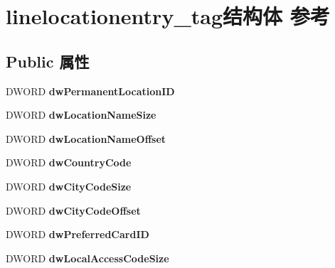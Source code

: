 \hypertarget{structlinelocationentry__tag}{}\section{linelocationentry\+\_\+tag结构体 参考}
\label{structlinelocationentry__tag}
\subsection*{Public 属性}
\begin{DoxyCompactItemize}
\item 
\mbox{\label{structlinelocationentry__tag_a9fea6e60f0cc53c4a5c5ba77cf2d4b78}} 
D\+W\+O\+RD {\bfseries dw\+Permanent\+Location\+ID}
\item 
\mbox{\label{structlinelocationentry__tag_a39fb30be5732d90025f25a7f64115bba}} 
D\+W\+O\+RD {\bfseries dw\+Location\+Name\+Size}
\item 
\mbox{\label{structlinelocationentry__tag_a5acd9a4fa107c3e8fa0ef400892caa88}} 
D\+W\+O\+RD {\bfseries dw\+Location\+Name\+Offset}
\item 
\mbox{\label{structlinelocationentry__tag_ab8a7beae6daeb09466c05abff464bb0c}} 
D\+W\+O\+RD {\bfseries dw\+Country\+Code}
\item 
\mbox{\label{structlinelocationentry__tag_a0d8142492938fa709c0310dc8e93740c}} 
D\+W\+O\+RD {\bfseries dw\+City\+Code\+Size}
\item 
\mbox{\label{structlinelocationentry__tag_aef2063a35836917fccd68130317b556f}} 
D\+W\+O\+RD {\bfseries dw\+City\+Code\+Offset}
\item 
\mbox{\label{structlinelocationentry__tag_a6598277aab590444238d306b9c0215af}} 
D\+W\+O\+RD {\bfseries dw\+Preferred\+Card\+ID}
\item 
\mbox{\label{structlinelocationentry__tag_a47c9abf5447637ab93880f7bad4d534b}} 
D\+W\+O\+RD {\bfseries dw\+Local\+Access\+Code\+Size}

\end{DoxyCompactItemize}

